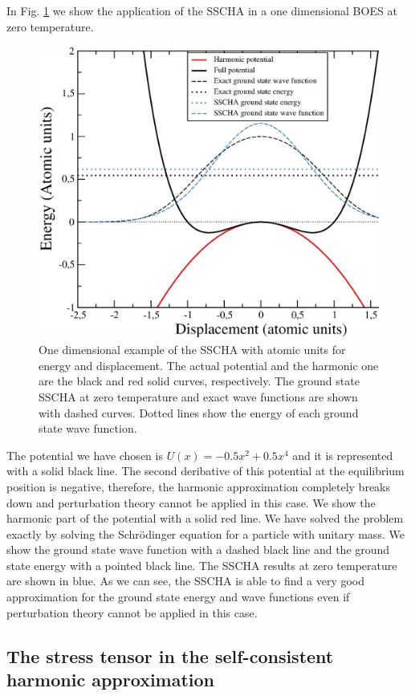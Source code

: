 In Fig. \ref{1dimsscha} we show the application of the SSCHA in a one dimensional BOES at zero temperature.
\begin{figure}[h]
\begin{center}
\includegraphics[width=0.8\linewidth]{Figures/result.eps}
\caption{One dimensional example of the SSCHA with atomic units for energy and displacement. The actual potential and the harmonic one are the black and red solid curves, respectively. The ground 
state SSCHA at zero temperature and exact wave functions are shown with dashed curves. Dotted lines show the energy of each ground state wave function.}
\label{1dimsscha}
\end{center}
\end{figure}
The potential we have chosen is $U(x)=-0.5x^{2}+0.5x^{4}$ and it is represented with a solid black line. The second deribative of this potential at the equilibrium position is negative, therefore, the harmonic approximation 
completely breaks down and perturbation theory cannot be applied in this case. We show the harmonic part of the potential with a solid red line. We have solved the problem exactly by solving the Schr\"odinger equation for 
a particle with unitary mass. We show the ground state wave function with a dashed black line and the ground state energy with a pointed black line. The SSCHA results at zero temperature are shown in blue. As we can 
see, the SSCHA is able to find a very good approximation for the ground state energy and wave functions even if perturbation theory cannot be applied in this case.  

\subsection{The stress tensor in the self-consistent harmonic approximation}

